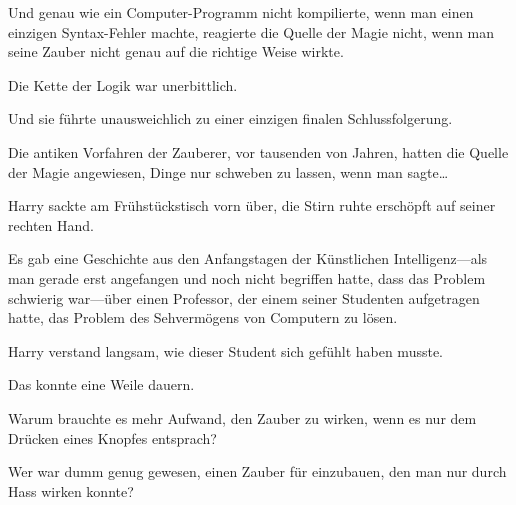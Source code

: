 Und genau wie ein Computer-Programm nicht kompilierte, wenn man einen einzigen Syntax-Fehler machte, reagierte die Quelle der Magie nicht, wenn man seine Zauber nicht genau auf die richtige Weise wirkte.

Die Kette der Logik war unerbittlich.

Und sie führte unausweichlich zu einer einzigen finalen Schlussfolgerung.

Die antiken Vorfahren der Zauberer, vor tausenden von Jahren, hatten die Quelle der Magie angewiesen, Dinge nur schweben zu lassen, wenn man sagte…


Harry sackte am Frühstückstisch vorn über, die Stirn ruhte erschöpft auf seiner rechten Hand.

Es gab eine Geschichte aus den Anfangstagen der Künstlichen Intelligenz—als man gerade erst angefangen und noch nicht begriffen hatte, dass das Problem schwierig war—über einen Professor, der einem seiner Studenten aufgetragen hatte, das Problem des Sehvermögens von Computern zu lösen.

Harry verstand langsam, wie dieser Student sich gefühlt haben musste.

Das konnte eine Weile dauern.

Warum brauchte es mehr Aufwand, den Zauber  zu wirken, wenn es nur dem Drücken eines Knopfes entsprach?

Wer war dumm genug gewesen, einen Zauber für  einzubauen, den man nur durch Hass wirken konnte?

